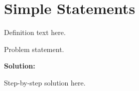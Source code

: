 \section{Simple Statements}


\begin{definition}[Term]
Definition text here.
\end{definition}

\begin{example}
Problem statement.

\textbf{Solution:}

Step-by-step solution here.
\end{example}
